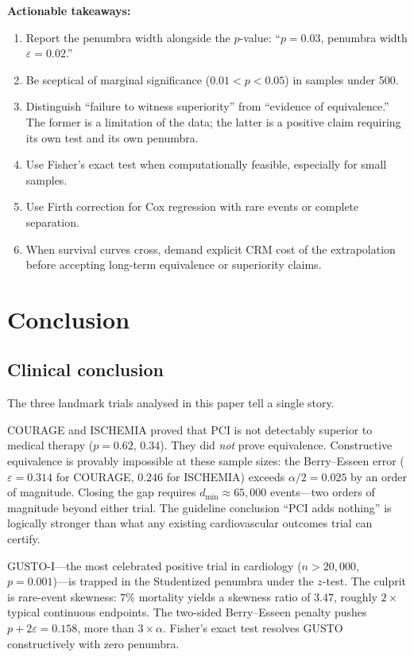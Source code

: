 \documentclass[11pt,a4paper]{article}
\theoremstyle{plain}
\theoremstyle{definition}
\begin{document}
\begin{tcolorbox}[
  colback=blue!5,
  colframe=blue!50!black,
  fonttitle=\bfseries\large,
  title={What This Means for a Clinician},
  arc=4pt,
  boxrule=1pt
]
\medskip

\textbf{Actionable takeaways:}
\begin{enumerate}[nosep, leftmargin=*]
\item Report the penumbra width alongside the $p$-value: ``$p = 0.03$, penumbra width $\varepsilon = 0.02$.''
\item Be sceptical of marginal significance ($0.01 < p < 0.05$) in samples under 500.
\item Distinguish ``failure to witness superiority'' from ``evidence of equivalence.''  The former is a limitation of the data; the latter is a positive claim requiring its own test and its own penumbra.
\item Use Fisher's exact test when computationally feasible, especially for small samples.
\item Use Firth correction for Cox regression with rare events or complete separation.
\item When survival curves cross, demand explicit CRM cost of the extrapolation before accepting long-term equivalence or superiority claims.
\end{enumerate}
\end{tcolorbox}

\section{Conclusion}\label{sec:conclusion}

\subsection*{Clinical conclusion}

The three landmark trials analysed in this paper tell a single story.

COURAGE and ISCHEMIA proved that PCI is not detectably superior to medical therapy ($p = 0.62$, $0.34$).  They did \emph{not} prove equivalence.  Constructive equivalence is provably impossible at these sample sizes: the Berry--Esseen error ($\varepsilon = 0.314$ for COURAGE, $0.246$ for ISCHEMIA) exceeds $\alpha/2 = 0.025$ by an order of magnitude.  Closing the gap requires $d_{\min} \approx 65{,}000$ events---two orders of magnitude beyond either trial.  The guideline conclusion ``PCI adds nothing'' is logically stronger than what any existing cardiovascular outcomes trial can certify.

GUSTO-I---the most celebrated positive trial in cardiology ($n > 20{,}000$, $p = 0.001$)---is trapped in the Studentized penumbra under the $z$-test.  The culprit is rare-event skewness: $7\%$ mortality yields a skewness ratio of $3.47$, roughly $2\times$ typical continuous endpoints.  The two-sided Berry--Esseen penalty pushes $p + 2\varepsilon = 0.158$, more than $3\times\alpha$.  Fisher's exact test resolves GUSTO constructively with zero penumbra.
\end{document}
